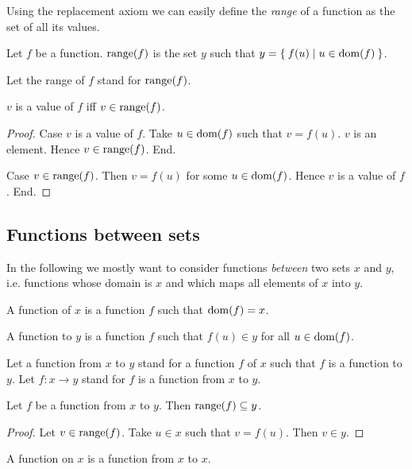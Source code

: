\documentclass[../../set-theory.tex]{subfiles}
\begin{document}
  Using the replacement axiom we can easily define the \textit{range} of a
  function as the set of all its values.

  \begin{forthel}
    \begin{definition}
      Let $f$ be a function.
      $\operatorname{range}(f)$ is the set $y$ such that $y = \Set{f(u) | u \in \operatorname{dom}(f)}$.
    \end{definition}

    Let the range of $f$ stand for $\operatorname{range}(f)$.


    \begin{proposition}\label{SetTheory_02_01_324423}
      $v$ is a value of $f$ iff $v \in \operatorname{range}(f)$.
    \end{proposition}
    \begin{proof}
      Case $v$ is a value of $f$.
        Take $u \in \operatorname{dom}(f)$ such that $v = f(u)$.
        $v$ is an element.
        Hence $v \in \operatorname{range}(f)$.
      End.

      Case $v \in \operatorname{range}(f)$.
        Then $v = f(u)$ for some $u \in \operatorname{dom}(f)$.
        Hence $v$ is a value of $f$.
      End.
    \end{proof}
  \end{forthel}


  \subsection{Functions between sets}

  In the following we mostly want to consider functions \textit{between} two
  sets $x$ and $y$, i.e. functions whose domain is $x$ and which maps all
  elements of $x$ into $y$.

  \begin{forthel}
    \begin{definition}
      A function of $x$ is a function $f$ such that $\operatorname{dom}(f) = x$.
    \end{definition}

    \begin{definition}
      A function to $y$ is a function $f$ such that $f(u) \in y$ for all $u \in \operatorname{dom}(f)$.
    \end{definition}

    Let a function from $x$ to $y$ stand for a function $f$ of $x$ such that $f$ is a function to $y$.
    Let $f: x \to y$ stand for $f$ is a function from $x$ to $y$.

    \begin{proposition}\label{SetTheory_02_01_694542}
      Let $f$ be a function from $x$ to $y$.
      Then $\operatorname{range}(f) \subseteq y$.
    \end{proposition}
    \begin{proof}
      Let $v \in \operatorname{range}(f)$.
      Take $u \in x$ such that $v = f(u)$.
      Then $v \in y$.
    \end{proof}

    \begin{definition}
      A function on $x$ is a function from $x$ to $x$.
    \end{definition}
  \end{forthel}
\end{document}
